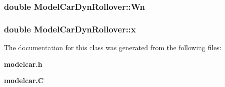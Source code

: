 \subsubsection{\setlength{\rightskip}{0pt plus 5cm}double Model\-Car\-Dyn\-Rollover::Wn}\label{classModelCarDynRollover_m7}


\subsubsection{\setlength{\rightskip}{0pt plus 5cm}double Model\-Car\-Dyn\-Rollover::x}\label{classModelCarDynRollover_m9}




The documentation for this class was generated from the following files:\begin{CompactItemize}
\item 
{\bf modelcar.h}\item 
{\bf modelcar.C}\end{CompactItemize}
